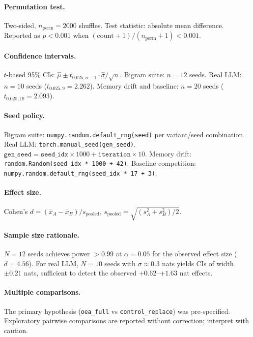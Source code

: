 \documentclass[11pt]{article}
\begin{document}
\paragraph{Permutation test.} Two-sided, $n_{\mathrm{perm}}=2000$ shuffles. Test statistic: absolute mean difference. Reported as $p < 0.001$ when $({\mathrm{count}+1})/(n_{\mathrm{perm}}+1) < 0.001$.

\paragraph{Confidence intervals.} $t$-based 95\% CIs: $\hat{\mu} \pm t_{0.025, n-1} \cdot \hat{\sigma}/\sqrt{n}$. Bigram suite: $n=12$ seeds. Real LLM: $n=10$ seeds ($t_{0.025,9}=2.262$). Memory drift and baseline: $n=20$ seeds ($t_{0.025,19}=2.093$).

\paragraph{Seed policy.}
Bigram suite: \texttt{numpy.random.default\_rng(seed)} per variant/seed combination.
Real LLM: \texttt{torch.manual\_seed(gen\_seed)}, $\texttt{gen\_seed} = \texttt{seed\_idx} \times 1000 + \texttt{iteration} \times 10$.
Memory drift: \texttt{random.Random(seed\_idx * 1000 + 42)}.
Baseline competition: \texttt{numpy.random.default\_rng(}\linebreak[0]\texttt{seed\_idx * 17 + 3)}.

\paragraph{Effect size.} Cohen's $d = (\bar{x}_A - \bar{x}_B) / s_{\mathrm{pooled}}$, $s_{\mathrm{pooled}} = \sqrt{(s_A^2 + s_B^2)/2}$.

\paragraph{Sample size rationale.} $N=12$ seeds achieves power $>0.99$ at $\alpha=0.05$ for the observed effect size ($d=4.56$). For real LLM, $N=10$ seeds with $\sigma \approx 0.3$ nats yields CIs of width $\pm 0.21$ nats, sufficient to detect the observed $+0.62$--$+1.63$ nat effects.

\paragraph{Multiple comparisons.} The primary hypothesis (\texttt{oea\_full} vs \texttt{control\_replace}) was pre-specified. Exploratory pairwise comparisons are reported without correction; interpret with caution.
\end{document}
